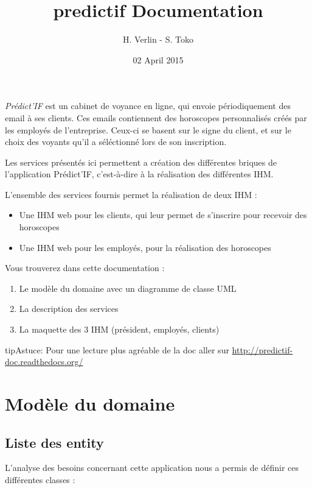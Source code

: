 \documentclass[a4paper,10pt,french]{sphinxmanual}
\title{predictif Documentation}
\date{02 April 2015}
\author{H. Verlin - S. Toko}
\begin{document}
\maketitle
\tableofcontents
{}\label{index::doc}


\emph{Prédict’IF} est un cabinet de voyance en ligne, qui envoie périodiquement des email à ses clients. Ces emails contiennent des horoscopes personnalisés créés par les employés de l'entreprise. Ceux-ci se basent sur le signe du client, et sur le choix des voyants qu'il a séléctionné lors de son inscription.

Les services présentés ici permettent a création des différentes briques de l'application Prédict’IF, c'est-à-dire à la réalisation des différentes IHM.

L'ensemble des services fournis permet la réalisation de deux IHM :
\begin{itemize}
\item {} 
Une IHM web pour les clients, qui leur permet de s'inscrire pour recevoir des horoscopes

\item {} 
Une IHM web pour les employés, pour la réalisation des horoscopes

\end{itemize}

Vous trouverez dans cette documentation :
\begin{enumerate}
\item {} 
Le modèle du domaine avec un diagramme de classe UML

\item {} 
La description des services

\item {} 
La maquette des 3 IHM (président, employés, clients)

\end{enumerate}

\begin{notice}{tip}{Astuce:}
Pour une lecture plus agréable de la doc aller sur \href{http://predictif-doc.readthedocs.org/}{http://predictif-doc.readthedocs.org/}
\end{notice}


\chapter{Modèle du domaine}
\label{modele:predictif-documentation}\label{modele::doc}\label{modele:modele-du-domaine}

\section{Liste des entity}
\label{modele:liste-des-entity}
L'analyse des besoins concernant cette application nous a permis de définir ces différentes classes :
\end{document}
